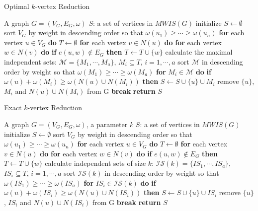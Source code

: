 \documentclass[sigconf, nonacm]{acmart}
\begin{document}
\begin{algorithm}[tbp]
\caption{Optimal $k$-vertex Reduction}
\label{alg:optimalkvertex}
\begin{algorithmic}[1]
	\REQUIRE A graph $G=(V_G,E_G,\omega)$
	\ENSURE $S$: a set of vertices in $MWIS(G)$
	\STATE   initialize $S\leftarrow \emptyset$
	\STATE   sort $V_G$ by weight in descending order so that $\omega(u_1)\geq\cdots\geq\omega(u_n)$
	\STATE   \textbf{for} each vertex $u\in V_G$ \textbf{do}
	\STATE   \quad $T \leftarrow \emptyset$
	\STATE   \quad \textbf{for} each vertex $v\in N(u)$ \textbf{do}
	\STATE   \quad \quad \textbf{for} each vertex $w\in N(v)$ \textbf{do}
	\STATE   \quad \quad \quad \textbf{if} $e(u,w) \notin E_G$ \textbf{then}
	\STATE   \quad \quad \quad \quad $T \leftarrow T \cup \{w\}$
	\STATE   \quad calculate the maximal independent sets: $\mathcal{M}=\{M_1,\cdots,M_a\}$, $M_i \subseteq T$, $i=1,\cdots,a$
	\STATE   \quad sort $\mathcal{M}$ in descending order by weight so that $\omega(M_1)\geq\cdots\geq\omega(M_a)$
	\STATE   \quad \textbf{for} $M_i\in\mathcal{M}$ \textbf{do}
	\STATE   \quad \quad \textbf{if} $\omega(u)+\omega(M_i)\geq \omega(N(u)\cup N(M_i))$ \textbf{then}
	\STATE   \quad \quad \quad $S\leftarrow S\cup\{u\}\cup M_i$
	\STATE   \quad \quad \quad remove $\{u\}$, $M_i$ and $N(u)\cup N(M_i)$ from G
	\STATE   \quad \quad \quad \textbf{break}
	\STATE   \textbf{return} $S$
\end{algorithmic}
\end{algorithm}

\begin{algorithm}[tbp]
\caption{Exact $k$-vertex Reduction}
\label{alg:exactkvertex}
\begin{algorithmic}[1]
	\REQUIRE A graph $G=(V_G,E_G,\omega)$, a parameter $k$
	\ENSURE $S$: a set of vertices in $MWIS(G)$
	\STATE   initialize $S\leftarrow \emptyset$
	\STATE   sort $V_G$ by weight in descending order so that $\omega(u_1)\geq\cdots\geq\omega(u_n)$
	\STATE   \textbf{for} each vertex $u\in V_G$ \textbf{do}
	\STATE   \quad $T \leftarrow \emptyset$
	\STATE   \quad \textbf{for} each vertex $v\in N(u)$ \textbf{do}
	\STATE   \quad \quad \textbf{for} each vertex $w\in N(v)$ \textbf{do}
	\STATE   \quad \quad \quad \textbf{if} $e(u,w) \notin E_G$ \textbf{then}
	\STATE   \quad \quad \quad \quad $T \leftarrow T \cup \{w\}$
	\STATE   \quad calculate independent sets of size $k$: $\mathcal{IS}(k)=\{IS_1,\cdots,IS_a\}$, $IS_i \subseteq T$, $i=1,\cdots,a$
	\STATE   \quad sort $\mathcal{IS}(k)$ in descending order by weight so that $\omega(IS_1)\geq\cdots\geq\omega(IS_a)$
	\STATE   \quad \textbf{for} $IS_i\in\mathcal{IS}(k)$ \textbf{do}
	\STATE   \quad \quad \textbf{if} $\omega(u)+\omega(IS_i)\geq \omega(N(u)\cup N(IS_i))$ \textbf{then}
	\STATE   \quad \quad \quad $S\leftarrow S\cup\{u\}\cup IS_i$
	\STATE   \quad \quad \quad remove $\{u\}$, $IS_i$ and $N(u)\cup N(IS_i)$ from G
	\STATE   \quad \quad \quad \textbf{break}
	\STATE   \textbf{return} $S$
\end{algorithmic}
\end{algorithm}
\end{document}
